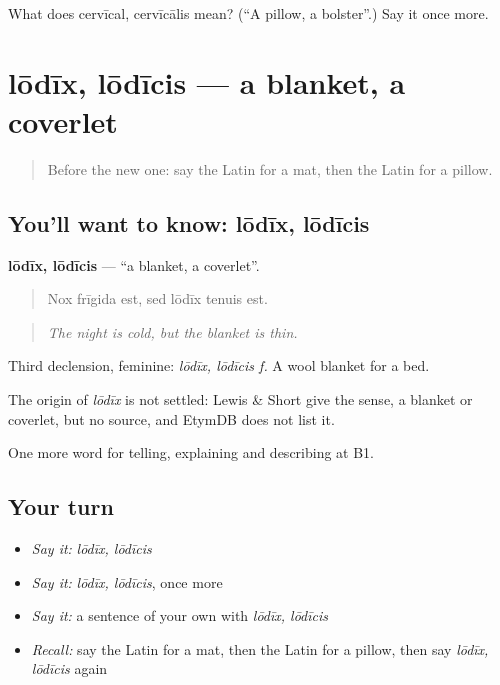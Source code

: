 \begin{tcolorbox}[breakable,colback=teal!4,colframe=teal!35!black,title={Before you move on}]
What does cervīcal, cervīcālis mean? (\textquotedblleft{}A pillow, a bolster\textquotedblright{}.) Say it once more.
\end{tcolorbox}
\section[lōdīx, lōdīcis]{lōdīx, lōdīcis — a blanket, a coverlet}

\label{lesson:LA-C446-lodix}



\begin{quote}
Before the new one: say the Latin for a mat, then the Latin for a pillow.
\end{quote}

\subsection*{You'll want to know: lōdīx, lōdīcis}
\textbf{lōdīx, lōdīcis} — \textquotedblleft{}a blanket, a coverlet\textquotedblright{}.

\begin{quote}
Nox frīgida est, sed lōdīx tenuis est.
\end{quote}

\begin{quote}
\emph{The night is cold, but the blanket is thin.}
\end{quote}

Third declension, feminine: \emph{lōdīx, lōdīcis f.} A wool blanket for a bed.

\begin{cousinweb}
The origin of \emph{lōdīx} is not settled: Lewis \& Short give the sense, a blanket or coverlet, but no source, and EtymDB does not list it.
\end{cousinweb}

\begin{grammarlens}[title={What you've built}]
One more word for telling, explaining and describing at B1.
\end{grammarlens}

\subsection*{Your turn}
\begin{itemize}
\raggedright
  \item \emph{Say it:} \emph{lōdīx, lōdīcis}
  \item \emph{Say it:} \emph{lōdīx, lōdīcis}, once more
  \item \emph{Say it:} a sentence of your own with \emph{lōdīx, lōdīcis}
  \item \emph{Recall:} say the Latin for a mat, then the Latin for a pillow, then say \emph{lōdīx, lōdīcis} again
\end{itemize}


